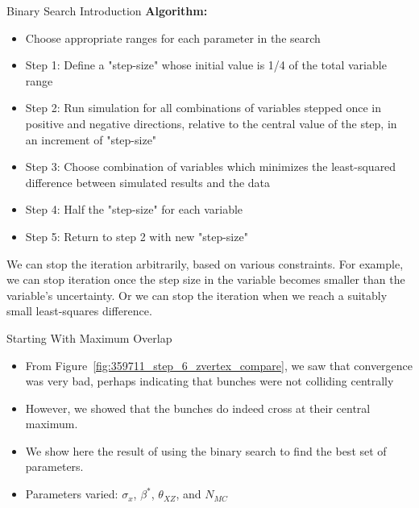 \begin{frame}{Binary Search Introduction}
\textbf{Algorithm:}
\begin{itemize}
	\item Choose appropriate ranges for each parameter in the search 
	\item Step 1: Define a "step-size" whose initial value is 1/4 of the total
		variable range
	\item Step 2: Run simulation for all combinations of variables stepped once
		in positive and negative directions, relative to the central value of the
		step, in an increment of "step-size"
	\item Step 3: Choose combination of variables which minimizes the
		least-squared difference between simulated results and the data
	\item Step 4: Half the "step-size" for each variable
	\item Step 5: Return to step 2 with new "step-size"
\end{itemize}
We can stop the iteration arbitrarily, based on various constraints. For
example, we can stop iteration once the step size in the variable becomes
smaller than the variable's uncertainty. Or we can stop the iteration when we
reach a suitably small least-squares difference.
\end{frame}

\begin{frame}{ Starting With Maximum Overlap }
	\begin{itemize}
		\item From Figure~\ref{fig:359711_step_6_zvertex_compare}, we saw that
			convergence was very bad, perhaps indicating that bunches were not
			colliding centrally 
		\item However, we showed that the bunches do indeed cross at their central
			maximum.
		\item We show here the result of using the binary search to find the best
			set of parameters.
		\item Parameters varied: $\sigma_{x}$, $\beta^{*}$, $\theta_{XZ}$, and $N_{MC}$
	\end{itemize}
\end{frame}

